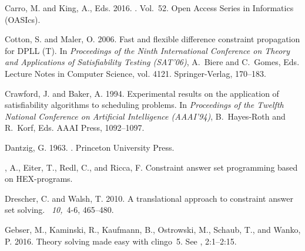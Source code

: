 \begin{thebibliography}{}
{\sc Carro, M.} {\sc and} {\sc King, A.}, Eds. 2016.
. Vol.~52. Open Access Series in
  Informatics (OASIcs).

{\sc Cotton, S.} {\sc and} {\sc Maler, O.} 2006.
\newblock Fast and flexible difference constraint propagation for {DPLL (T)}.
\newblock In {\em Proceedings of the Ninth International Conference on Theory
  and Applications of Satisfiability Testing (SAT'06)}, {A.~Biere} {and}
  {C.~Gomes}, Eds. Lecture Notes in Computer Science, vol. 4121.
  Springer-Verlag, 170--183.

{\sc Crawford, J.} {\sc and} {\sc Baker, A.} 1994.
\newblock Experimental results on the application of satisfiability algorithms
  to scheduling problems.
\newblock In {\em Proceedings of the Twelfth National Conference on Artificial
  Intelligence (AAAI'94)}, {B.~Hayes-Roth} {and} {R.~Korf}, Eds. AAAI Press,
  1092--1097.

{\sc Dantzig, G.} 1963.
.
\newblock Princeton University Press.

{, A.}, {\sc Eiter, T.}, {\sc Redl, C.}, {\sc and} {\sc Ricca,
  F.}
\newblock Constraint answer set programming based on {HEX}-programs.

{\sc Drescher, C.} {\sc and} {\sc Walsh, T.} 2010.
\newblock A translational approach to constraint answer set solving.
~{\em 10,\/}~4-6,
  465--480.

{\sc Gebser, M.}, {\sc Kaminski, R.}, {\sc Kaufmann, B.}, {\sc Ostrowski, M.},
  {\sc Schaub, T.}, {\sc and} {\sc Wanko, P.} 2016.
\newblock Theory solving made easy with clingo~5.
\newblock See , 2:1--2:15.


\end{thebibliography}
